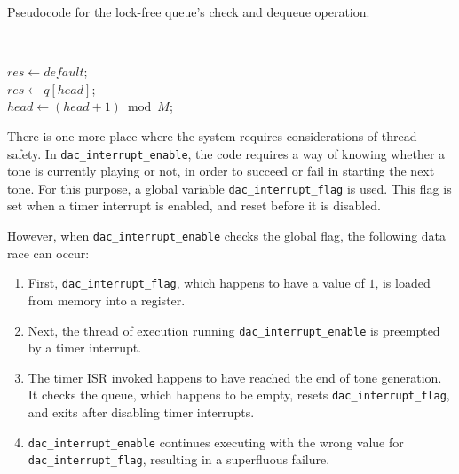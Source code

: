 \documentclass[11pt,a4paper,twocolumn]{scrartcl}
\begin{document}
\begin{algorithm}
   \caption{Pseudocode for the lock-free queue's check
 and dequeue operation.}~\label{alg:check_dequeue}
 
      $res \gets default$;\\
      {
         $res \gets q[head]$;\\
         $head \gets (head + 1) \bmod M$;
      }
\end{algorithm}

There is one more place where the system requires considerations of thread safety. In \verb!dac_interrupt_enable!, the code requires a way of knowing whether a tone is currently playing or not, in order to succeed or fail in starting the next tone. For this purpose, a global variable \verb!dac_interrupt_flag! is used. This flag is set when a timer interrupt is enabled, and reset before it is disabled.

However, when \verb!dac_interrupt_enable! checks the global flag, the following data race can occur:
\begin{enumerate}
   \item First, \verb!dac_interrupt_flag!, which happens to have a value of $1$, is loaded from memory into a register.
   \item Next, the thread of execution running \verb!dac_interrupt_enable! is preempted by a timer interrupt.
   \item The timer ISR invoked happens to have reached the end of tone generation. It checks the queue, which happens to be empty, resets \verb!dac_interrupt_flag!, and exits after disabling timer interrupts.
   \item \verb!dac_interrupt_enable! continues executing with the wrong value for \verb!dac_interrupt_flag!, resulting in a superfluous failure.
\end{enumerate}
\end{document}

